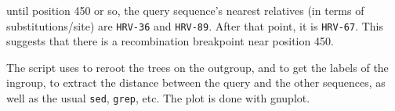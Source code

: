 \smallskip{}
\noindent{}until position 450 or so, the query sequence's nearest relatives (in
terms of substitutions/site) are \texttt{HRV-36} and \texttt{HRV-89}. After
that point, it is \texttt{HRV-67}. This suggests that there is a recombination
breakpoint near position 450.

The script uses \reroot{} to reroot the trees on the outgroup, \clade{} and
 to get the labels of the ingroup, \distance{} to extract the distance
between the query and the other sequences, as well as the usual \texttt{sed}, \texttt{grep}, etc. The plot is done with gnuplot.
